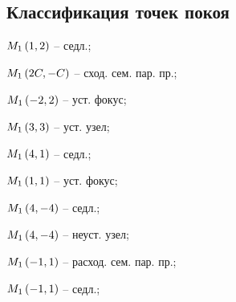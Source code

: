 \subsection*{Классификация точек покоя}

	\begin{enumsols}

		\item \( M_1 \left( 1, 2 \right) \) -- седл.; %
		\item \( M_1 \left( 2C, -C \right) \) -- сход. сем. пар. пр.; %
		\item \( M_1 \left( -2, 2 \right) \) -- уст. фокус; %
		\item \( M_1 \left( 3, 3 \right) \) -- уст. узел; %
		\item \( M_1 \left( 4, 1 \right) \) -- седл.; %
		\item \( M_1 \left( 1, 1 \right) \) -- уст. фокус; %
		\item \( M_1 \left( 4, -4 \right) \) -- седл.; %
		\item \( M_1 \left( 4, -4 \right) \) -- неуст. узел; %
		\item \( M_1 \left( -1, 1 \right) \) -- расход. сем. пар. пр.; %
		\item \( M_1 \left( -1, 1 \right) \) -- седл.; %


\end{enumsols}
